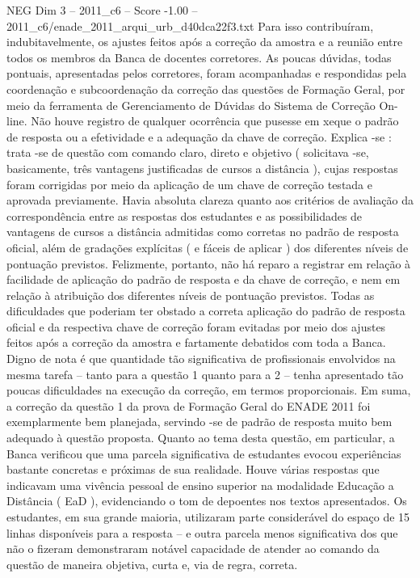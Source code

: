 \begin{textsample}{NEG Dim 3 – 2011\_c6 – Score -1.00 – 2011\_c6/enade\_2011\_arqui\_urb\_d40dca22f3.txt}
Para isso contribuíram, indubitavelmente, os ajustes feitos após a correção da amostra e a reunião entre todos os membros da Banca de docentes corretores.
As poucas dúvidas, todas pontuais, apresentadas pelos corretores, foram acompanhadas e respondidas pela coordenação e subcoordenação da correção das questões de Formação Geral, por meio da ferramenta de Gerenciamento de Dúvidas do Sistema de Correção On-line.
Não houve registro de qualquer ocorrência que pusesse em xeque o padrão de resposta ou a efetividade e a adequação da chave de correção.
Explica -se : trata -se de questão com comando claro, direto e objetivo ( solicitava -se, basicamente, três vantagens justificadas de cursos a distância ), cujas respostas foram corrigidas por meio da aplicação de um chave de correção testada e aprovada previamente.
Havia absoluta clareza quanto aos critérios de avaliação da correspondência entre as respostas dos estudantes e as possibilidades de vantagens de cursos a distância admitidas como corretas no padrão de resposta oficial, além de gradações explícitas ( e fáceis de aplicar ) dos diferentes níveis de pontuação previstos.
Felizmente, portanto, não há reparo a registrar em relação à facilidade de aplicação do padrão de resposta e da chave de correção, e nem em relação à atribuição dos diferentes níveis de pontuação previstos.
Todas as dificuldades que poderiam ter obstado a correta aplicação do padrão de resposta oficial e da respectiva chave de correção foram evitadas por meio dos ajustes feitos após a correção da amostra e fartamente debatidos com toda a Banca.
Digno de nota é que quantidade tão significativa de profissionais envolvidos na mesma tarefa – tanto para a questão 1 quanto para a 2 – tenha apresentado tão poucas dificuldades na execução da correção, em termos proporcionais.
Em suma, a correção da questão 1 da prova de Formação Geral do ENADE 2011 foi exemplarmente bem planejada, servindo -se de padrão de resposta muito bem adequado à questão proposta.
Quanto ao tema desta questão, em particular, a Banca verificou que uma parcela significativa de estudantes evocou experiências bastante concretas e próximas de sua realidade.
Houve várias respostas que indicavam uma vivência pessoal de ensino superior na modalidade Educação a Distância ( EaD ), evidenciando o tom de depoentes nos textos apresentados.
Os estudantes, em sua grande maioria, utilizaram parte considerável do espaço de 15 linhas disponíveis para a resposta – e outra parcela menos significativa dos que não o fizeram demonstraram notável capacidade de atender ao comando da questão de maneira objetiva, curta e, via de regra, correta.

\end{textsample}
